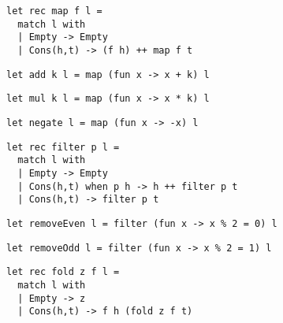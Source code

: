 \documentclass{beamer}
\begin{document}
\begin{frame}[fragile]
\begin{lstlisting}
let rec map f l =
  match l with
  | Empty -> Empty
  | Cons(h,t) -> (f h) ++ map f t
\end{lstlisting}
\end{frame}

\begin{frame}[fragile]
\begin{lstlisting}
let add k l = map (fun x -> x + k) l
\end{lstlisting}
\end{frame}

\begin{frame}[fragile]
\begin{lstlisting}
let mul k l = map (fun x -> x * k) l
\end{lstlisting}
\end{frame}

\begin{frame}[fragile]
\begin{lstlisting}
let negate l = map (fun x -> -x) l
\end{lstlisting}
\end{frame}

\begin{frame}[fragile]
\begin{lstlisting}
let rec filter p l =
  match l with
  | Empty -> Empty
  | Cons(h,t) when p h -> h ++ filter p t
  | Cons(h,t) -> filter p t
\end{lstlisting}
\end{frame}

\begin{frame}[fragile]
\begin{lstlisting}
let removeEven l = filter (fun x -> x % 2 = 0) l
\end{lstlisting}
\end{frame}

\begin{frame}[fragile]
\begin{lstlisting}
let removeOdd l = filter (fun x -> x % 2 = 1) l
\end{lstlisting}
\end{frame}

\begin{frame}[fragile]
\begin{lstlisting}
let rec fold z f l = 
  match l with
  | Empty -> z
  | Cons(h,t) -> f h (fold z f t)
\end{lstlisting}
\end{frame}
\end{document}
